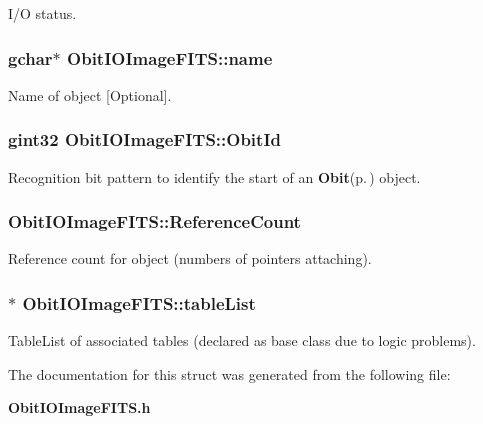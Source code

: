 I/O status. 

\subsubsection{\setlength{\rightskip}{0pt plus 5cm}gchar$\ast$ {\bf Obit\-IOImage\-FITS::name}}\label{structObitIOImageFITS_o3}


Name of object [Optional]. 

\subsubsection{\setlength{\rightskip}{0pt plus 5cm}gint32 {\bf Obit\-IOImage\-FITS::Obit\-Id}}\label{structObitIOImageFITS_o0}


Recognition bit pattern to identify the start of an {\bf Obit}{\rm (p.\,\pageref{structObit})} object. 

\subsubsection{ {\bf Obit\-IOImage\-FITS::Reference\-Count}}\label{structObitIOImageFITS_o2}


Reference count for object (numbers of pointers attaching). 

\subsubsection{$\ast$ {\bf Obit\-IOImage\-FITS::table\-List}}\label{structObitIOImageFITS_o9}


Table\-List of associated tables (declared as base class due to logic problems). 



The documentation for this struct was generated from the following file:\begin{CompactItemize}
\item 
{\bf Obit\-IOImage\-FITS.h}\end{CompactItemize}
